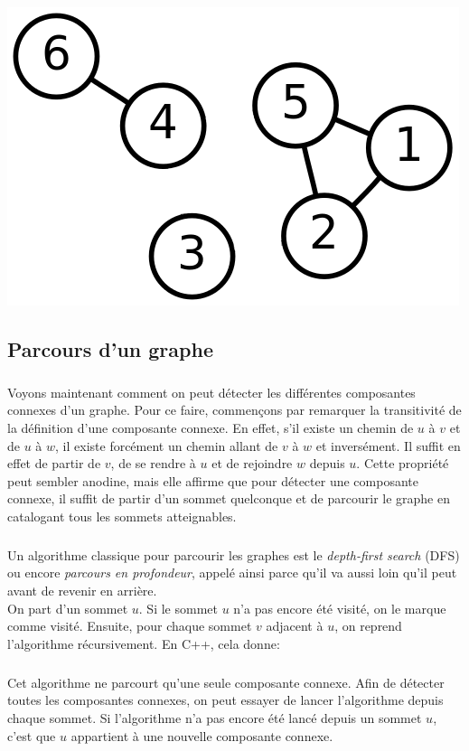 \begin{center}
\includegraphics[width=0.5\linewidth]{images/3-components.png}
\end{center}

\subsection{Parcours d'un graphe}
\subparagraph{}
Voyons maintenant comment on peut détecter les différentes composantes connexes d'un graphe. Pour ce faire, commençons par remarquer la transitivité de la définition d'une composante connexe. En effet, s'il existe un chemin de $u$ à $v$ et de $u$ à $w$, il existe forcément un chemin allant de $v$ à $w$ et inversément. Il suffit en effet de partir de $v$, de se rendre à $u$ et de rejoindre $w$ depuis $u$. Cette propriété peut sembler anodine, mais elle affirme que pour détecter une composante connexe, il suffit de partir d'un sommet quelconque et de parcourir le graphe en catalogant tous les sommets atteignables.

\subparagraph{}
Un algorithme classique pour parcourir les graphes est le \textit{depth-first search} (DFS) ou encore \textit{parcours en profondeur}, appelé ainsi parce qu'il va aussi loin qu'il peut avant de revenir en arrière. \\
On part d'un sommet $u$. Si le sommet $u$ n'a pas encore été visité, on le marque comme visité. Ensuite, pour chaque sommet $v$ adjacent à $u$, on reprend l'algorithme récursivement. En C++, cela donne:



\subparagraph{}
Cet algorithme ne parcourt qu'une seule composante connexe. Afin de détecter toutes les composantes connexes, on peut essayer de lancer l'algorithme depuis chaque sommet. Si l'algorithme n'a pas encore été lancé depuis un sommet $u$, c'est que $u$ appartient à une nouvelle composante connexe.



